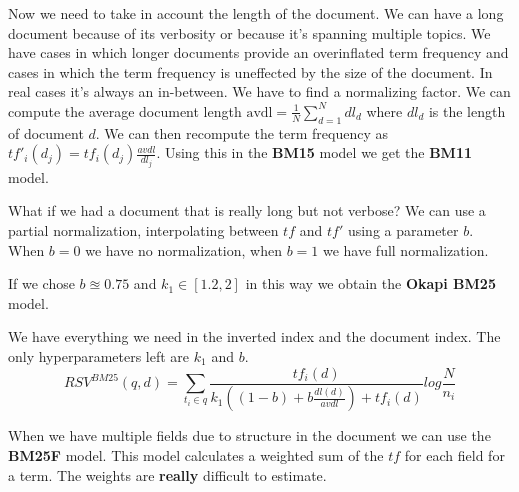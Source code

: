 Now we need to take in account the length of the document.
We can have a long document because of its verbosity or because it's
spanning multiple topics.
We have cases in which longer documents provide an overinflated term frequency
and cases in which the term frequency is uneffected by the size of the document.
In real cases it's always an in-between. We have to find a normalizing factor.
We can compute the average document length $\text{avdl}=\frac{1}{N}\sum_{d=1}^{N}dl_d$
where $dl_d$ is the length of document $d$.
We can then recompute the term frequency as $tf'_i(d_j)=tf_i(d_j)\frac{avdl}{dl_j}$.
Using this in the \textbf{BM15} model we get the \textbf{BM11} model.

What if we had a document that is really long but not verbose?
We can use a partial normalization, interpolating between $tf$ and $tf'$ using a 
parameter $b$. When $b=0$ we have no normalization, when $b=1$ we have full normalization.

If we chose $b\approxeq0.75$ and $k_1\in[1.2,2]$ in this way we obtain the \textbf{Okapi BM25} model.

We have everything we need in the inverted index and the document index.
The only hyperparameters left are $k_1$ and $b$.
\[
    RSV^{BM25}(q,d) = 
        \sum_{t_i\in q}\frac{tf_i(d)}{k_1((1-b)+b\frac{dl(d)}{avdl})+tf_i(d)}log\frac{N}{n_i}
\]

When we have multiple fields due to structure in the document we can use the \textbf{BM25F} model.
This model calculates a weighted sum of the $tf$ for each field for a term.
The weights are \textbf{really} difficult to estimate.